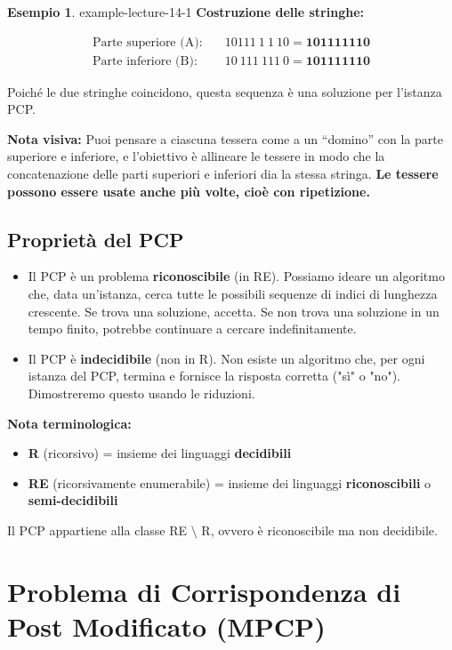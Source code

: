 \documentclass[a4paper]{article}
\theoremstyle{definition} %
\newtheorem{example}{Esempio}
\theoremstyle{remark} %
\begin{document}
\begin{example}{}{{ example-lecture-14-1 }}
\textbf{Costruzione delle stringhe:}

\begin{align*}
  \text{Parte superiore (A):}\quad & 10111\ 1\ 1\ 10 = \textbf{101111110} \\
  \text{Parte inferiore (B):}\quad & 10\ 111\ 111\ 0 = \textbf{101111110}
\end{align*}

Poiché le due stringhe coincidono, questa sequenza è una soluzione per l'istanza PCP.

\textbf{Nota visiva:} Puoi pensare a ciascuna tessera come a un ``domino'' con la parte superiore e inferiore, e l'obiettivo è allineare le tessere in modo che la concatenazione delle parti superiori e inferiori dia la stessa stringa. 
\textbf{Le tessere possono essere usate anche più volte, cioè con ripetizione.}

\end{example}

\subsection{Proprietà del PCP}
\begin{itemize}
\item Il PCP è un problema \textbf{riconoscibile} (in RE). Possiamo ideare un algoritmo che, data un'istanza, cerca tutte le possibili sequenze di indici di lunghezza crescente. Se trova una soluzione, accetta. Se non trova una soluzione in un tempo finito, potrebbe continuare a cercare indefinitamente.
\item Il PCP è \textbf{indecidibile} (non in R). Non esiste un algoritmo che, per ogni istanza del PCP, termina e fornisce la risposta corretta ("sì" o "no"). Dimostreremo questo usando le riduzioni.
\end{itemize}

\textbf{Nota terminologica:}
\begin{itemize}
\item \textbf{R} (ricorsivo) = insieme dei linguaggi \textbf{decidibili}
\item \textbf{RE} (ricorsivamente enumerabile) = insieme dei linguaggi \textbf{riconoscibili} o \textbf{semi-decidibili}
\end{itemize}

Il PCP appartiene alla classe RE $\setminus$ R, ovvero è riconoscibile ma non decidibile.

\section{Problema di Corrispondenza di Post Modificato (MPCP)}
\end{document}
